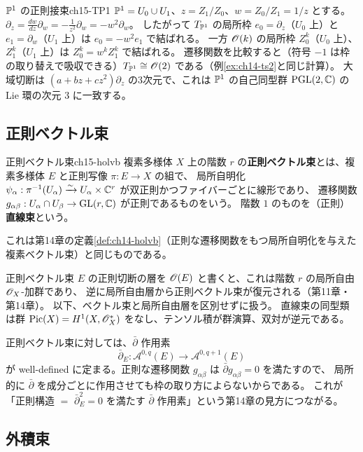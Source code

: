 \begin{myex}{$\mathbb{P}^1$ の正則接束}{ch15-TP1}
$\mathbb{P}^1 = U_0\cup U_1$、$z = Z_1/Z_0$、$w = Z_0/Z_1 = 1/z$ とする。
$\partial_z = \frac{dw}{dz}\partial_w = -\frac{1}{z^2}\partial_w = -w^2\partial_w$。
したがって $T_{\mathbb{P}^1}$ の局所枠 $e_0 = \partial_z$（$U_0$ 上）と $e_1 = \partial_w$（$U_1$ 上）は $e_0 = -w^2 e_1$ で結ばれる。
一方 $\mathscr{O}(k)$ の局所枠 $Z_0^k$（$U_0$ 上）、$Z_1^k$（$U_1$ 上）は $Z_0^k = w^k Z_1^k$ で結ばれる。
遷移関数を比較すると（符号 $-1$ は枠の取り替えで吸収できる）$T_{\mathbb{P}^1}\cong\mathscr{O}(2)$ である（例\ref{ex:ch14-ts2}と同じ計算）。
大域切断は $(a+bz+cz^2)\partial_z$ の3次元で、これは $\mathbb{P}^1$ の自己同型群 $\operatorname{PGL}(2,\mathbb{C})$ の Lie 環の次元 $3$ に一致する。
\end{myex}

\subsection{正則ベクトル束}

\begin{mydef}{正則ベクトル束}{ch15-holvb}
複素多様体 $X$ 上の階数 $r$ の\textbf{正則ベクトル束}とは、複素多様体 $E$ と正則写像 $\pi:E\to X$ の組で、
局所自明化 $\psi_\alpha:\pi^{-1}(U_\alpha)\xrightarrow{\sim} U_\alpha\times\mathbb{C}^r$ が双正則かつファイバーごとに線形であり、
遷移関数 $g_{\alpha\beta} : U_\alpha\cap U_\beta \to \operatorname{GL}(r,\mathbb{C})$ が正則であるものをいう。
階数 $1$ のものを（正則）\textbf{直線束}という。
\end{mydef}
これは第14章の定義\ref{def:ch14-holvb}（正則な遷移関数をもつ局所自明化を与えた複素ベクトル束）と同じものである。

正則ベクトル束 $E$ の正則切断の層を $\mathscr{O}(E)$ と書くと、これは階数 $r$ の局所自由 $\mathscr{O}_X$-加群であり、
逆に局所自由層から正則ベクトル束が復元される（第11章・第14章）。
以下、ベクトル束と局所自由層を区別せずに扱う。
直線束の同型類は群 $\operatorname{Pic}(X) = H^1(X,\mathscr{O}_X^*)$ をなし、テンソル積が群演算、双対が逆元である。

正則ベクトル束に対しては、$\bar\partial$ 作用素
\[
\bar\partial_E : \mathcal{A}^{0,q}(E)\to\mathcal{A}^{0,q+1}(E)
\]
が well-defined に定まる。正則な遷移関数 $g_{\alpha\beta}$ は $\bar\partial g_{\alpha\beta}=0$ を満たすので、
局所的に $\bar\partial$ を成分ごとに作用させても枠の取り方によらないからである。
これが「正則構造 $=$ $\bar\partial_E^2=0$ を満たす $\bar\partial$ 作用素」という第14章の見方につながる。

\subsection{外積束}

